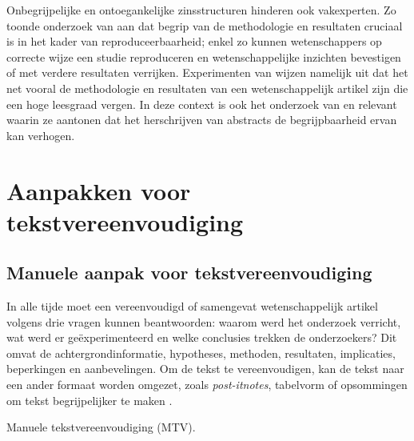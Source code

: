 \medspace

Onbegrijpelijke en ontoegankelijke zinsstructuren hinderen ook vakexperten. Zo toonde onderzoek van \textcite{McNutt2014} aan dat begrip van de methodologie en resultaten cruciaal is in het kader van reproduceerbaarheid; enkel zo kunnen wetenschappers op correcte wijze een studie reproduceren en wetenschappelijke inzichten bevestigen of met verdere resultaten verrijken. Experimenten van \textcite{Hubbard2017} wijzen namelijk uit dat het net vooral de methodologie en resultaten van een wetenschappelijk artikel zijn die een hoge leesgraad vergen. In deze context is ook het onderzoek van \textcite{Hartley1999} en \textcite{Snow2010} relevant waarin ze aantonen dat het herschrijven van abstracts de begrijpbaarheid ervan kan verhogen.


\section{Aanpakken voor tekstvereenvoudiging}

\subsection{Manuele aanpak voor tekstvereenvoudiging}


In alle tijde moet een vereenvoudigd of samengevat wetenschappelijk artikel volgens \textcite{Hollenkamp2020, McCombes2022} drie vragen kunnen beantwoorden: waarom werd het onderzoek verricht, wat werd er geëxperimenteerd en welke conclusies trekken de onderzoekers? Dit omvat de achtergrondinformatie, hypotheses, methoden, resultaten, implicaties, beperkingen en aanbevelingen. Om de tekst te vereenvoudigen, kan de tekst naar een ander formaat worden omgezet, zoals \textit{post-itnotes}, tabelvorm of opsommingen om tekst begrijpelijker te maken \autocite{Rijkhoff2022}. 

Manuele tekstvereenvoudiging (MTV).

